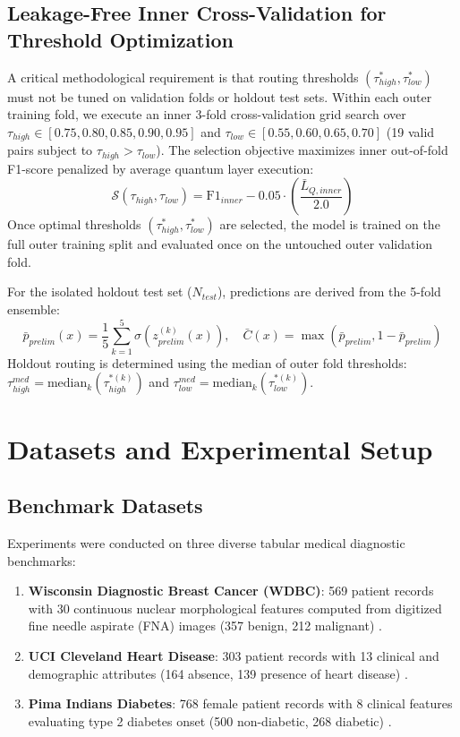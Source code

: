 \documentclass[conference]{IEEEtran}
\begin{document}
\subsection{Leakage-Free Inner Cross-Validation for Threshold Optimization}
A critical methodological requirement is that routing thresholds $(\tau_{high}^*, \tau_{low}^*)$ must not be tuned on validation folds or holdout test sets. Within each outer training fold, we execute an inner 3-fold cross-validation grid search over $\tau_{high} \in [0.75, 0.80, 0.85, 0.90, 0.95]$ and $\tau_{low} \in [0.55, 0.60, 0.65, 0.70]$ (19 valid pairs subject to $\tau_{high} > \tau_{low}$). The selection objective maximizes inner out-of-fold F1-score penalized by average quantum layer execution:
\begin{equation}
\mathcal{S}(\tau_{high}, \tau_{low}) = \text{F1}_{inner} - 0.05 \cdot \left(\frac{\bar{L}_{Q, inner}}{2.0}\right)
\end{equation}
Once optimal thresholds $(\tau_{high}^*, \tau_{low}^*)$ are selected, the model is trained on the full outer training split and evaluated once on the untouched outer validation fold.

For the isolated holdout test set ($N_{test}$), predictions are derived from the 5-fold ensemble:
\begin{equation}
\bar{p}_{prelim}(x) = \frac{1}{5}\sum_{k=1}^5 \sigma(z_{prelim}^{(k)}(x)), \quad \bar{C}(x) = \max(\bar{p}_{prelim}, 1 - \bar{p}_{prelim})
\end{equation}
Holdout routing is determined using the median of outer fold thresholds: $\tau_{high}^{med} = \text{median}_{k}(\tau_{high}^{*(k)})$ and $\tau_{low}^{med} = \text{median}_{k}(\tau_{low}^{*(k)})$.

\section{Datasets and Experimental Setup}

\subsection{Benchmark Datasets}
Experiments were conducted on three diverse tabular medical diagnostic benchmarks:
\begin{enumerate}
    \item \textbf{Wisconsin Diagnostic Breast Cancer (WDBC)}: 569 patient records with 30 continuous nuclear morphological features computed from digitized fine needle aspirate (FNA) images (357 benign, 212 malignant) \cite{street1993nuclear}.
    \item \textbf{UCI Cleveland Heart Disease}: 303 patient records with 13 clinical and demographic attributes (164 absence, 139 presence of heart disease) \cite{detrano1989international}.
    \item \textbf{Pima Indians Diabetes}: 768 female patient records with 8 clinical features evaluating type 2 diabetes onset (500 non-diabetic, 268 diabetic) \cite{smith1988using}.
\end{enumerate}
\end{document}
